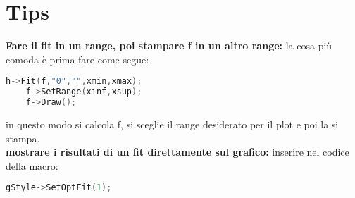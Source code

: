 \section{Tips}
\textbf{Fare il fit in un range, poi stampare f in un altro range:} la cosa più comoda è prima fare come segue:
\begin{lstlisting}[language=C++,label={cod1},mathescape=true,breaklines=true]
	h->Fit(f,"0","",xmin,xmax);
	f->SetRange(xinf,xsup);
	f->Draw();
\end{lstlisting}
in questo modo si calcola f, si sceglie il range desiderato per il plot e poi la si stampa.\\
\textbf{mostrare i risultati di un fit direttamente sul grafico:} inserire nel codice della macro:
\begin{lstlisting}[language=C++,label={cod1},mathescape=true,breaklines=true]
	gStyle->SetOptFit(1);
\end{lstlisting}